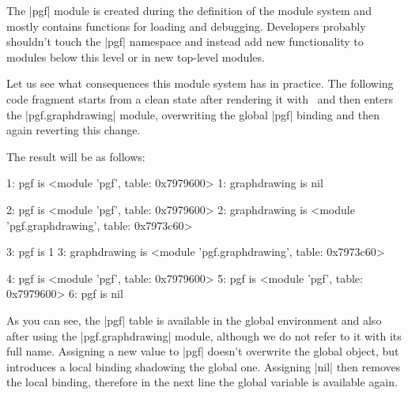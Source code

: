 The |pgf| module is created during the definition of the module system
and mostly contains functions for loading and debugging.  Developers
probably shouldn't touch the |pgf| namespace and instead add new
functionality to modules below this level or in new top-level
modules.

Let us see what consequences this module system has in practice.  The
following code fragment starts from a clean state after rendering it
with \LuaTeX\ and then enters the |pgf.graphdrawing| module,
overwriting the global |pgf| binding and then again reverting this
change.

\begin{codeexample}
\usetikzlibrary{graphdrawing}

\end{codeexample}

The result will be as follows:

\begin{codeexample}
1: pgf is <module 'pgf', table: 0x7979600>
1: graphdrawing is nil

2: pgf is <module 'pgf', table: 0x7979600>
2: graphdrawing is <module 'pgf.graphdrawing', table: 0x7973c60>

3: pgf is 1
3: graphdrawing is <module 'pgf.graphdrawing', table: 0x7973c60>

4: pgf is <module 'pgf', table: 0x7979600>
5: pgf is <module 'pgf', table: 0x7979600>
6: pgf is nil
\end{codeexample}

As you can see, the |pgf| table is available in the global environment
and also after using the |pgf.graphdrawing| module, although we do not 
refer to it with its full name.  Assigning a new value to |pgf|
doesn't overwrite the global object, but introduces a local binding
shadowing the global one. Assigning |nil| then removes the local
binding, therefore in the next line the global variable is available
again.

